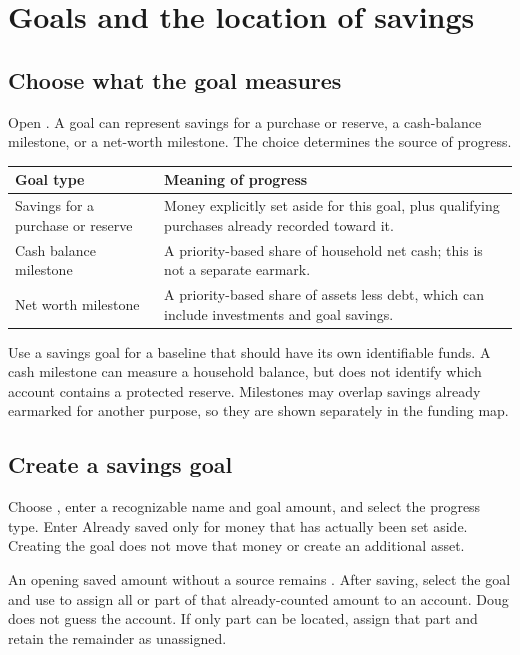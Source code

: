 \chapter{Goals and the location of savings}\label{ch:goals}
\section{Choose what the goal measures}
Open . A goal can represent savings for a purchase or reserve, a cash-balance milestone, or a net-worth milestone. The choice determines the source of progress.

\begin{tabularx}{\textwidth}{@{}p{}Y@{}}
\toprule Goal type & Meaning of progress\\\midrule
Savings for a purchase or reserve & Money explicitly set aside for this goal, plus qualifying purchases already recorded toward it.\\
Cash balance milestone & A priority-based share of household net cash; this is not a separate earmark.\\
Net worth milestone & A priority-based share of assets less debt, which can include investments and goal savings.\\
\bottomrule
\end{tabularx}

Use a savings goal for a baseline that should have its own identifiable funds. A cash milestone can measure a household balance, but does not identify which account contains a protected reserve. Milestones may overlap savings already earmarked for another purpose, so they are shown separately in the funding map.

\section{Create a savings goal}
Choose , enter a recognizable name and goal amount, and select the progress type. Enter Already saved only for money that has actually been set aside. Creating the goal does not move that money or create an additional asset.

An opening saved amount without a source remains . After saving, select the goal and use  to assign all or part of that already-counted amount to an account. Doug does not guess the account. If only part can be located, assign that part and retain the remainder as unassigned.


